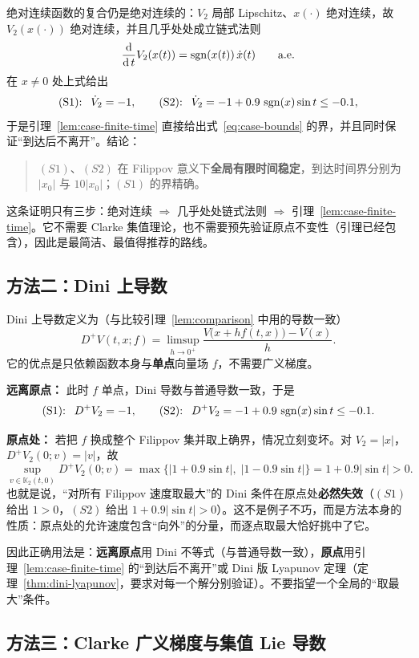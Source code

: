 绝对连续函数的复合仍是绝对连续的：$V_2$ 局部 Lipschitz、$x(\cdot)$ 绝对连续，故 $V_2(x(\cdot))$ 绝对连续，并且几乎处处成立链式法则
\[
\frac{\operatorname{d}}{\operatorname{d} t}V_2(x(t))=\operatorname{sgn}(x(t))\,\dot x(t)\qquad\text{a.e.}
\]
在 $x\neq0$ 处上式给出
\[
\text{(S1): }\ \dot V_2=-1,
\qquad
\text{(S2): }\ \dot V_2=-1+0.9\,\operatorname{sgn}(x)\sin t\le-0.1 ,
\]
于是引理~\ref{lem:case-finite-time} 直接给出式~\eqref{eq:case-bounds} 的界，并且同时保证“到达后不离开”。结论：

\begin{quote}
$(S1)$、$(S2)$ 在 Filippov 意义下\textbf{全局有限时间稳定}，到达时间界分别为 $|x_0|$ 与 $10|x_0|$；$(S1)$ 的界精确。
\end{quote}

这条证明只有三步：绝对连续 $\Rightarrow$ 几乎处处链式法则 $\Rightarrow$ 引理~\ref{lem:case-finite-time}。它不需要 Clarke 集值理论，也不需要预先验证原点不变性（引理已经包含），因此是最简洁、最值得推荐的路线。

\subsection{方法二：Dini 上导数}

Dini 上导数定义为（与比较引理~\ref{lem:comparison} 中用的导数一致）
\[
D^+V(t,x;f)=\limsup_{h\to0^+}\frac{V\big(x+hf(t,x)\big)-V(x)}{h}.
\]
它的优点是只依赖函数本身与\textbf{单点}向量场 $f$，不需要广义梯度。

\textbf{远离原点：} 此时 $f$ 单点，Dini 导数与普通导数一致，于是
\[
\text{(S1): }\ D^+V_2=-1,
\qquad
\text{(S2): }\ D^+V_2=-1+0.9\,\operatorname{sgn}(x)\sin t\le-0.1 .
\]

\textbf{原点处：} 若把 $f$ 换成整个 Filippov 集并取上确界，情况立刻变坏。对 $V_2=|x|$，$D^+V_2(0;v)=|v|$，故
\[
\sup_{v\in\mathbb{K}_2(t,0)}D^+V_2(0;v)
=\max\big\{|1+0.9\sin t|,\;|1-0.9\sin t|\big\}
=1+0.9|\sin t|>0 .
\]
也就是说，“对所有 Filippov 速度取最大”的 Dini 条件在原点处\textbf{必然失效}（$(S1)$ 给出 $1>0$，$(S2)$ 给出 $1+0.9|\sin t|>0$）。这不是例子不巧，而是方法本身的性质：原点处的允许速度包含“向外”的分量，而逐点取最大恰好挑中了它。

因此正确用法是：\textbf{远离原点}用 Dini 不等式（与普通导数一致），\textbf{原点}用引理~\ref{lem:case-finite-time} 的“到达后不离开”或 Dini 版 Lyapunov 定理（定理~\ref{thm:dini-lyapunov}，要求对每一个解分别验证）。不要指望一个全局的“取最大”条件。

\subsection{方法三：Clarke 广义梯度与集值 Lie 导数}

